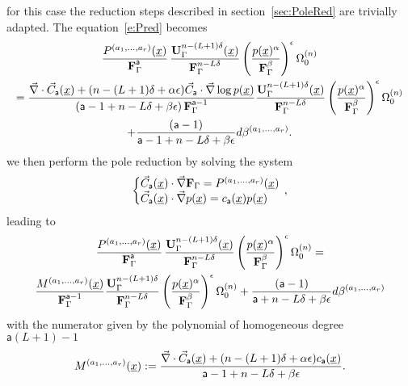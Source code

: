 \documentclass[a4paper,12pt]{article}
\numberwithin{equation}{section}
\numberwithin{figure}{section}
\begin{document}
for this case the reduction steps described in
section~\ref{sec:PoleRed} are trivially adapted.
The equation~\eqref{e:Pred} becomes
\begin{multline}
	\label{e:PredAnalytic}
{  P^{(a_1,\dots,a_r)}(\underline x)\over \textbf{F}_\Gamma^{\mathsf{a}}}\, { \textbf{U}_\Gamma^{n-(L+1)\delta} (\underline x)\over \textbf{F}_\Gamma^{n-L\delta}}
  \left(p(\underline x)^\alpha\over \textbf{F}_\Gamma^\beta\right)^\epsilon\Omega^{(n)}_0\cr={
\vec\nabla \cdot \vec C_{\mathsf{a}}
     (\underline x)
+   (n-(L+1)\delta+\alpha\epsilon) \vec
    C_{\mathsf{a}}\cdot\vec\nabla\log p(\underline x)\over (\mathsf{a}-1+n-L\delta+\beta\epsilon)\,\textbf{F}_\Gamma^{\mathsf{a}-1}}
{ \textbf{U}_\Gamma^{n-(L+1)\delta} (\underline x)\over \textbf{F}_\Gamma^{n-L\delta}}
   \left(p(\underline x)^\alpha\over \textbf{F}_\Gamma^\beta\right)^\epsilon
  \Omega_0^{(n)}\cr
+{  (\mathsf{a}-1) \over \mathsf{a}-1+n-L\delta+\beta\epsilon} d\beta^{(a_1,\dots,a_r)}.
\end{multline}
we then perform the pole reduction 
by solving the system
\begin{equation}\label{e:sysCFUanalytic}
   \left\{\begin{array}{@{}l@{}}
\vec C_{\mathsf{a}} (\underline x) \cdot \vec \nabla \textbf{F}_\Gamma
            =    P^{(a_1,\dots,a_r)}(\underline x)\\
\vec C_{\mathsf{a}} (\underline x)\cdot\vec \nabla p(\underline x)=
            c_{{\mathsf{a}}}(\underline x) p(\underline x) 
  \end{array}\right.\,,
\end{equation}
leading to 
\begin{multline}\label{e:RedFinalanalytic}
{  P^{(a_1,\dots,a_r)}(\underline x)\over \textbf{F}_\Gamma^{\mathsf{a}}}\, { \textbf{U}_\Gamma^{n-(L+1)\delta} (\underline x)\over \textbf{F}_\Gamma^{n-L\delta}}
  \left(p(\underline x)^\alpha\over \textbf{F}_\Gamma^\beta\right)^{\epsilon} \Omega^{(n)}_0=\cr{
M^{(a_1,\dots,a_r)}
     (\underline x)
\over \textbf{F}_\Gamma^{\mathsf{a}-1}}
{ \textbf{U}_\Gamma^{n-(L+1)\delta}\over \textbf{F}_\Gamma^{n-L\delta}}
  \left(p(\underline x)^\alpha\over \textbf{F}_\Gamma^\beta\right)^{\epsilon} 
  \Omega_0^{(n)}
+{  (\mathsf{a}-1) \over \mathsf{a}+n-L\delta+\beta\epsilon} d\beta^{(a_1,\dots,a_r)}
\end{multline}
with the numerator given by the polynomial of homogeneous degree $\mathsf{a}(L+1)-1$
\begin{equation}
  \label{e:Mfinalanalytic}
  M^{(a_1,\dots,a_r)}(\underline x):={\vec\nabla \cdot \vec C_{\mathsf{a}}
     (\underline x)
+  (n-(L+1)\delta+\alpha\epsilon) 
    c_{\mathsf{a}}(\underline x)\over \mathsf{a}-1+n-L\delta+\beta\epsilon}.
\end{equation}
%
\end{document}
